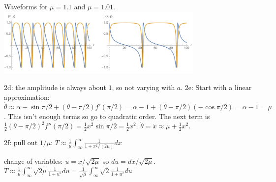 \documentclass[12pt,letterpaper,noanswers]{exam}
\begin{document}
Waveforms for $\mu = 1.1$ and $\mu = 1.01$. \includegraphics[width=4in]{img/InfinitePeriod.pdf}

2d: the amplitude is always about $1$, so not varying with $a$.
2e: Start with a linear approximation: $\dot \theta \approx \alpha - \sin\pi/2 + (\theta - \pi/2)f'(\pi/2) = \alpha -1 + (\theta -\pi/2)(-\cos \pi/2) = \alpha -1 = \mu$.  This isn't enough terms so go to quadratic order.  The next term is $\frac{1}{2}(\theta - \pi/2)^2f''(\pi/2) = \frac{1}{2} x^2 \sin \pi/2 = \frac{1}{2}x^2$.  $\dot \theta = \dot x \approx \mu + \frac{1}{2}x^2.$

2f: pull out $1/\mu$: $\displaystyle T \approx \frac{1}{\mu}\int_{\infty}^\infty \frac{1}{1+x^2/(2\mu)}dx$

change of variables: $u = x/\sqrt{2\mu}$ so $du = dx/\sqrt{2\mu}$.  $\displaystyle T \approx \frac{1}{\mu} \int_{\infty}^\infty \sqrt{2\mu}\frac{1}{1+u^2}du = \frac{1}{\sqrt{\mu}}\int_{\infty}^\infty \sqrt{2}\frac{1}{1+u^2}du$
\end{document}
